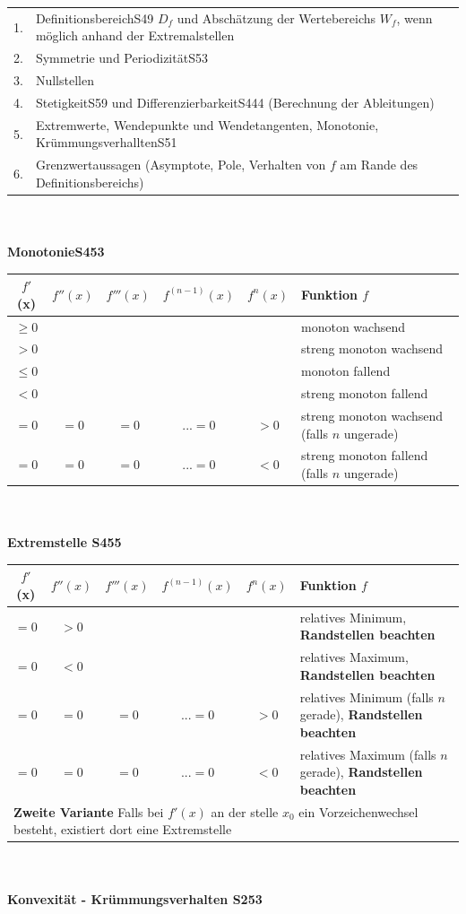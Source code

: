 \documentclass[6pt,a4paper]{scrartcl}
\begin{document}
\begin{multicols*}{2}
\begin{tabular}{p{1mm}p{12cm}}
	1.&	Definitionsbereich{\color{red}S49} $D_{f}$ und Abschätzung der Wertebereichs $W_{f}$, wenn möglich anhand der Extremalstellen\\
	2.& Symmetrie und Periodizität{\color{red}S53}\\
	3.& Nullstellen\\
	4.& Stetigkeit{\color{red}S59} und Differenzierbarkeit{\color{red}S444} (Berechnung der Ableitungen)\\
	5.& Extremwerte, Wendepunkte und Wendetangenten, Monotonie, Krümmungsverhallten{\color{red}S51}\\
	6.& Grenzwertaussagen (Asymptote, Pole, Verhalten von $f$ am Rande des Definitionsbereichs)\\
\end{tabular}
\\
\\
\textbf{Monotonie{\color{red}S453}}

\begin{tabular}{|c|c|c|c|c|l|}
	\hline
	$f'$(x) & $f''(x)$ & $f'''(x)$ & $f^{(n-1)}(x)$ & $f^{n}(x)$ & Funktion $f$\\
	\hline
	$\geq0$ &&&&& monoton wachsend\\
	\hline
	$>0$ &&&&& streng monoton wachsend\\
	\hline
	$\leq0$ &&&&& monoton fallend\\	
	\hline
	$<0$ &&&&& streng monoton fallend\\
	\hline
	$=0$ & $=0$ & $=0$ & $...=0$ & $>0$ & streng monoton wachsend (falls $n$ ungerade)\\
	\hline
	$=0$ & $=0$ & $=0$ & $...=0$ & $<0$ & streng monoton fallend (falls $n$ ungerade)\\
	\hline
\end{tabular}
\\
\\
\textbf{Extremstelle \color{red}S455}

\begin{tabular}{|c|c|c|c|c|l|}
	\hline
	$f'$(x) & $f''(x)$ & $f'''(x)$ & $f^{(n-1)}(x)$ & $f^{n}(x)$ & Funktion $f$\\
	\hline
	$=0$ & $>0$ &&&& relatives Minimum, \textbf{Randstellen beachten}\\
	\hline
	$=0$ & $<0$ &&&& relatives Maximum, \textbf{Randstellen beachten}\\
	\hline
	$=0$ & $=0$ & $=0$ & $...=0$ & $>0$ & relatives Minimum (falls $n$ gerade), \textbf{Randstellen beachten}\\
	\hline
	$=0$ & $=0$ & $=0$ & $...=0$ & $<0$ & relatives Maximum (falls $n$ gerade), \textbf{Randstellen beachten}\\
	\hline
	\multicolumn{6}{|l|}{\textbf{Zweite Variante} Falls bei $f'(x)$ an der stelle $x_{0}$ ein Vorzeichenwechsel besteht, existiert dort eine Extremstelle}\\
	\hline
\end{tabular}
\\
\\
\textbf{Konvexität - Krümmungsverhalten \color{red}S253}


\end{multicols*}
\end{document}
